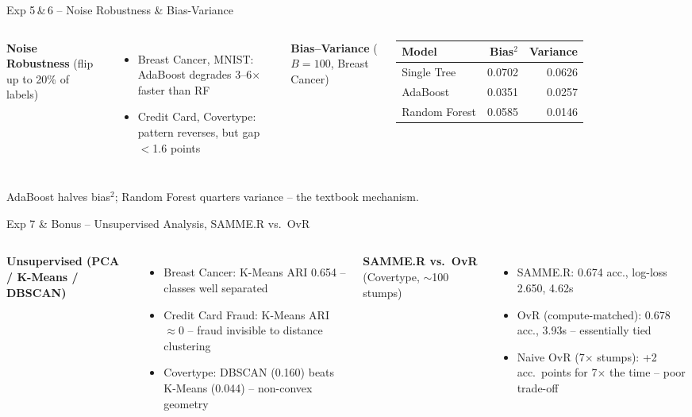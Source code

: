 \documentclass[aspectratio=169,11pt]{beamer}
\begin{document}
\begin{frame}{Exp 5\,\&\,6 -- Noise Robustness \& Bias-Variance}
\begin{columns}[t]
\textbf{Noise Robustness} (flip up to 20\% of labels)
\begin{itemize}\small
  \item Breast Cancer, MNIST: AdaBoost degrades 3--6$\times$ faster than RF
  \item Credit Card, Covertype: pattern reverses, but gap $<$1.6 points
\end{itemize}
\textbf{Bias--Variance} ($B{=}100$, Breast Cancer)
\begin{tabular}{lrr}
\toprule
Model & Bias$^2$ & Variance \\
\midrule
Single Tree & 0.0702 & 0.0626 \\
AdaBoost & 0.0351 & 0.0257 \\
Random Forest & 0.0585 & 0.0146 \\
\bottomrule
\end{tabular}
\end{columns}
\vfill
\small AdaBoost halves bias$^2$; Random Forest quarters variance -- the textbook mechanism.
\end{frame}

\begin{frame}{Exp 7 \& Bonus -- Unsupervised Analysis, SAMME.R vs.\ OvR}
\begin{columns}[t]
\textbf{Unsupervised (PCA / K-Means / DBSCAN)}
\begin{itemize}\scriptsize
  \item Breast Cancer: K-Means ARI 0.654 -- classes well separated
  \item Credit Card Fraud: K-Means ARI $\approx$0 -- fraud invisible to distance clustering
  \item Covertype: DBSCAN (0.160) beats K-Means (0.044) -- non-convex geometry
\end{itemize}
\textbf{SAMME.R vs.\ OvR} (Covertype, $\sim$100 stumps)
\begin{itemize}\scriptsize
  \item SAMME.R: 0.674 acc., log-loss 2.650, 4.62s
  \item OvR (compute-matched): 0.678 acc., 3.93s -- essentially tied
  \item Naive OvR (7$\times$ stumps): +2 acc.\ points for 7$\times$ the time -- poor trade-off
\end{itemize}
\end{columns}
\end{frame}
\end{document}
